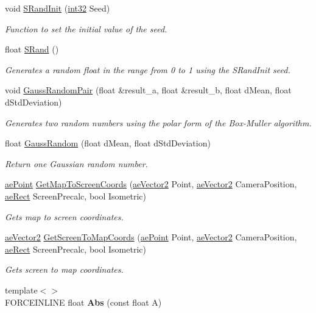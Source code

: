 \begin{DoxyCompactItemize}
\item 
void \hyperlink{namespaceae_core_a2c863d5b4c10a1e2b3a082d21aa556d5}{S\+Rand\+Init} (\hyperlink{namespaceae_core_a862bc39eb87cfabca273f49e2a920129}{int32} Seed)
\begin{DoxyCompactList}\small\item\em Function to set the initial value of the seed. \end{DoxyCompactList}\item 
float \hyperlink{namespaceae_core_aefa36e8f9f0e8a5f96a3a08349ecaf33}{S\+Rand} ()
\begin{DoxyCompactList}\small\item\em Generates a random float in the range from 0 to 1 using the S\+Rand\+Init seed. \end{DoxyCompactList}\item 
void \hyperlink{namespaceae_core_aa028dd1f50f9d79db1ccf58ddc64b729}{Gauss\+Random\+Pair} (float \&result\+\_\+a, float \&result\+\_\+b, float d\+Mean, float d\+Std\+Deviation)
\begin{DoxyCompactList}\small\item\em Generates two random numbers using the polar form of the Box-\/\+Muller algorithm. \end{DoxyCompactList}\item 
float \hyperlink{namespaceae_core_a0d7dbd2dd241e6f9741502777fd5fb25}{Gauss\+Random} (float d\+Mean, float d\+Std\+Deviation)
\begin{DoxyCompactList}\small\item\em Return one Gaussian random number. \end{DoxyCompactList}\item 
\hyperlink{structae_core_1_1ae_point}{ae\+Point} \hyperlink{namespaceae_core_a5134c200abd7d0125caf1f1d6258f78d}{Get\+Map\+To\+Screen\+Coords} (\hyperlink{structae_core_1_1ae_vector2}{ae\+Vector2} Point, \hyperlink{structae_core_1_1ae_vector2}{ae\+Vector2} Camera\+Position, \hyperlink{structae_core_1_1ae_rect}{ae\+Rect} Screen\+Precalc, bool Isometric)
\begin{DoxyCompactList}\small\item\em Gets map to screen coordinates. \end{DoxyCompactList}\item 
\hyperlink{structae_core_1_1ae_vector2}{ae\+Vector2} \hyperlink{namespaceae_core_afe966a085ebb2ecbbb1953302ec3ed7e}{Get\+Screen\+To\+Map\+Coords} (\hyperlink{structae_core_1_1ae_point}{ae\+Point} Point, \hyperlink{structae_core_1_1ae_vector2}{ae\+Vector2} Camera\+Position, \hyperlink{structae_core_1_1ae_rect}{ae\+Rect} Screen\+Precalc, bool Isometric)
\begin{DoxyCompactList}\small\item\em Gets screen to map coordinates. \end{DoxyCompactList}\item 
{\footnotesize template$<$$>$ }\\F\+O\+R\+C\+E\+I\+N\+L\+I\+NE float {\bfseries Abs} (const float A)\hypertarget{namespaceae_core_aa3e9dbd69c1201c15eec5882f37750a7}{}\label{namespaceae_core_aa3e9dbd69c1201c15eec5882f37750a7}

\end{DoxyCompactItemize}
